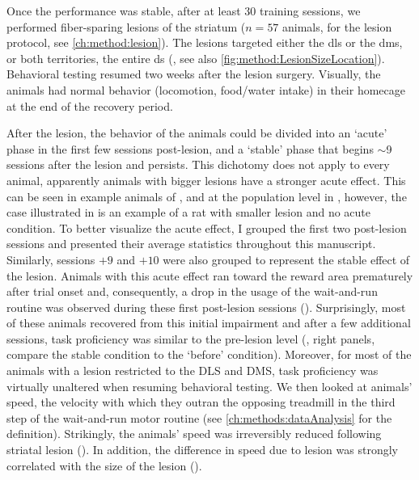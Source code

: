 
\par
Once the performance was stable, after at least 30 training sessions, we performed fiber-sparing lesions of the striatum ($n=57$ animals, for the lesion protocol, see \autoref{ch:method:lesion}).
The lesions targeted either the \gls{dls} or the \gls{dms}, or both territories, the entire \gls{ds} (, see also \autoref{fig:method:LesionSizeLocation}).
Behavioral testing resumed two weeks after the lesion surgery.
Visually, the animals had normal behavior (locomotion, food/water intake) in their homecage at the end of the recovery period.
\par
After the lesion, the behavior of the animals could be divided into an `acute' phase in the first few sessions post-lesion, and a `stable' phase that begins $\sim$9 sessions after the lesion and persists.
This dichotomy does not apply to every animal, apparently animals with bigger lesions have a stronger acute effect.
This can be seen in example animals of , and at the population level in , however, the case illustrated in  is an example of a rat with smaller lesion and no acute condition.
To better visualize the acute effect, I grouped the first two post-lesion sessions and presented their average statistics throughout this manuscript.
Similarly, sessions $+9$ and $+10$ were also grouped to represent the stable effect of the lesion.
Animals with this acute effect ran toward the reward area prematurely after trial onset and, consequently, a drop in the usage of the wait-and-run routine was observed during these first post-lesion sessions ().
Surprisingly, most of these animals recovered from this initial impairment and after a few additional sessions, task proficiency was similar to the pre-lesion level (, right panels, compare the stable condition to the `before' condition).
Moreover, for most of the animals with a lesion restricted to the DLS and DMS, task proficiency was virtually unaltered when resuming behavioral testing.
We then looked at animals' speed, the velocity with which they outran the opposing treadmill in the third step of the wait-and-run motor routine (see \autoref{ch:methods:dataAnalysis} for the definition).
Strikingly, the animals' speed was irreversibly reduced following striatal lesion ().
In addition, the difference in speed due to lesion was strongly correlated with the size of the lesion ().
